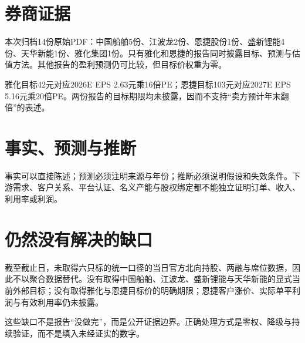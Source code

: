 \section{券商证据}

本次归档14份原始PDF：中国船舶5份、江波龙2份、恩捷股份1份、盛新锂能4份、天华新能1份、雅化集团1份。只有雅化和恩捷的报告同时披露目标、预测与估值方法。其他报告的盈利预测仍可比较，但目标价权重为零。

雅化目标42元对应2026E EPS 2.63元乘16倍PE；恩捷目标103元对应2027E EPS 5.16元乘20倍PE。两份报告的目标期限均未披露，因而不支持“卖方预计年末翻倍”的表述。

\section{事实、预测与推断}

\begin{exhibitbox}
\centering
{}
\end{exhibitbox}

事实可以直接陈述；预测必须注明来源与年份；推断必须说明假设和失效条件。下游需求、客户关系、平台认证、名义产能与股权绑定都不能独立证明订单、收入、利用率或利润。

\section{仍然没有解决的缺口}

截至截止日，未取得六只标的统一口径的当日官方北向持股、两融与席位数据，因此不以聚合数据替代。没有取得中国船舶、江波龙、盛新锂能与天华新能的显式当前外部目标；没有取得雅化与恩捷目标价的明确期限；恩捷客户涨价、实际单平利润与有效利用率仍未披露。

这些缺口不是报告“没做完”，而是公开证据边界。正确处理方式是零权、降级与持续验证，而不是填入未经证实的数字。

\clearpage
